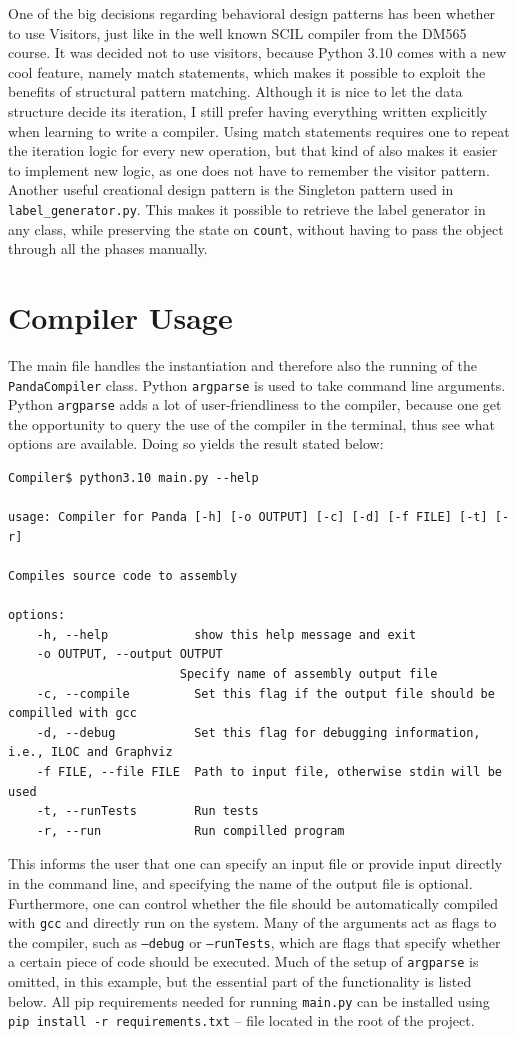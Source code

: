One of the big decisions regarding behavioral design patterns has been whether to use Visitors, just like in the well known SCIL compiler from the DM565 course. It was decided not to use visitors, because Python 3.10 comes with a new cool feature, namely match statements, which makes it possible to exploit the benefits of structural pattern matching. Although it is nice to let the data structure decide its iteration, I still prefer having everything written explicitly when learning to write a compiler. Using match statements requires one to repeat the iteration logic for every new operation, but that kind of also makes it easier to implement new logic, as one does not have to remember the visitor pattern. Another useful creational design pattern is the Singleton pattern used in \texttt{label\_generator.py}. This makes it possible to retrieve the label generator in any class, while preserving the state on \texttt{count}, without having to pass the object through all the phases manually.

\section{Compiler Usage}
The main file handles the instantiation and therefore also the running of the \texttt{PandaCompiler} class. Python \texttt{argparse} is used to take command line arguments. Python \texttt{argparse} adds a lot of user-friendliness to the compiler, because one get the opportunity to query the use of the compiler in the terminal, thus see what options are available. Doing so yields the result stated below:

\begin{verbatim}
Compiler$ python3.10 main.py --help

usage: Compiler for Panda [-h] [-o OUTPUT] [-c] [-d] [-f FILE] [-t] [-r]

Compiles source code to assembly

options:
    -h, --help            show this help message and exit
    -o OUTPUT, --output OUTPUT
                        Specify name of assembly output file
    -c, --compile         Set this flag if the output file should be compilled with gcc
    -d, --debug           Set this flag for debugging information, i.e., ILOC and Graphviz
    -f FILE, --file FILE  Path to input file, otherwise stdin will be used
    -t, --runTests        Run tests
    -r, --run             Run compilled program
\end{verbatim}

This informs the user that one can specify an input file or provide input directly in the command line, and specifying the name of the output file is optional. Furthermore, one can control whether the file should be automatically compiled with \texttt{gcc} and directly run on the system. Many of the arguments act as flags to the compiler, such as \texttt{--debug} or \texttt{--runTests}, which are flags that specify whether a certain piece of code should be executed. Much of the setup of \texttt{argparse} is omitted, in this example, but the essential part of the functionality is listed below. All pip requirements needed for running \texttt{main.py} can be installed using \texttt{pip install -r requirements.txt} -- file located in the root of the project.

